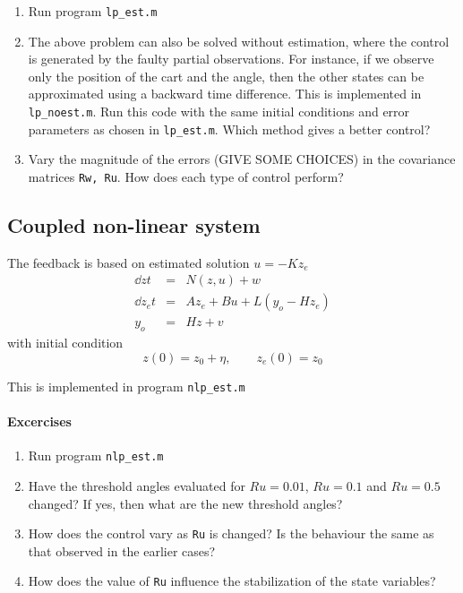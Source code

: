 \documentclass[12pt]{article}
\begin{document}
\begin{enumerate}

\item Run program {\tt lp\_est.m}

\item The above problem can also be solved without estimation, where the control is generated by the faulty partial observations. For instance, if we observe only the position of the cart and the angle, then the other states can be approximated using a backward time difference. This is implemented in {\tt lp\_noest.m}. Run this code with the same initial conditions and error parameters as chosen in {\tt lp\_est.m}. Which method gives a better control?  

\item Vary the magnitude of the errors (GIVE SOME CHOICES) in the covariance matrices {\tt Rw, Ru}. How does each type of control perform?
\end{enumerate}


\subsection{Coupled non-linear system}

The feedback is based on estimated solution $u = -K z_e$
\begin{eqnarray*}
\dd{z}{t} &=& N(z, u) + w \\
\dd{z_e}{t} &=& A z_e + B u + L(y_o - H z_e) \\
y_o &=& H z + v
\end{eqnarray*}
with initial condition
\[
z(0) = z_0 + \eta, \qquad z_e(0) = z_0
\]

This is implemented in program {\tt nlp\_est.m}

\paragraph{Excercises}

\begin{enumerate}

\item Run program {\tt nlp\_est.m}

\item Have the threshold angles evaluated for $Ru=0.01$, $Ru=0.1$ and $Ru=0.5$ changed? If yes, then what are the new threshold angles?

\item How does the control vary as {\tt Ru} is changed? Is the behaviour the same as that observed in the earlier cases?

\item How does the value of {\tt Ru} influence the stabilization of the state variables?

\end{enumerate}
\end{document}
